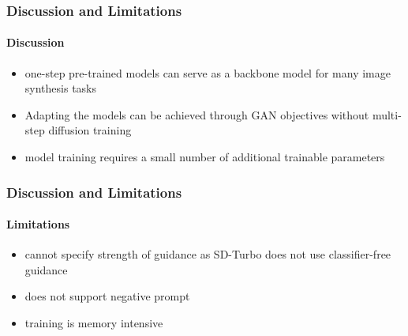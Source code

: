 \begin{frame}
    \frametitle{Discussion and Limitations}
    \framesubtitle{Discussion}
    \begin{itemize}
        \item one-step pre-trained models can serve as a backbone model for many image synthesis tasks
        \item Adapting the models can be achieved through GAN objectives without multi-step diffusion training
        \item model training requires a small number of additional trainable parameters
    \end{itemize}
\end{frame}
    
\begin{frame}
    \frametitle{Discussion and Limitations}
    \framesubtitle{Limitations}
    \begin{itemize}
        \item cannot specify strength of guidance as SD-Turbo does not use classifier-free guidance
        \item does not support negative prompt
        \item training is memory intensive
    \end{itemize}
    
\end{frame}